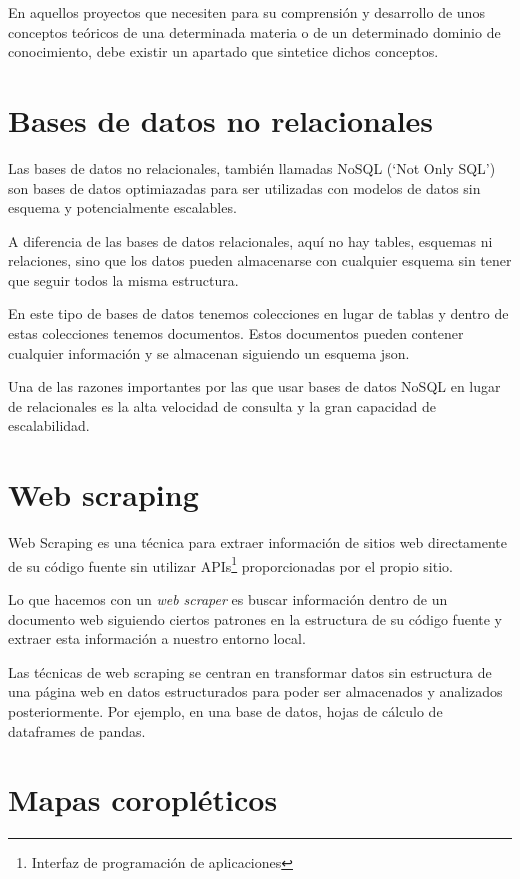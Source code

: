 
En aquellos proyectos que necesiten para su comprensión y desarrollo de unos conceptos teóricos de una determinada materia o de un determinado dominio de conocimiento, debe existir un apartado que sintetice dichos conceptos.


\section{Bases de datos no relacionales}

Las bases de datos no relacionales\cite{wiki:nosql}, también llamadas NoSQL (`Not Only SQL') son bases de datos optimiazadas para ser utilizadas con modelos de datos sin esquema y potencialmente escalables.

A diferencia de las bases de datos relacionales, aquí no hay tables, esquemas ni relaciones, sino que los datos pueden almacenarse con cualquier esquema sin tener que seguir todos la misma estructura.

En este tipo de bases de datos tenemos colecciones en lugar de tablas y dentro de estas colecciones tenemos documentos. Estos documentos pueden contener cualquier información y se almacenan siguiendo un esquema json.

Una de las razones importantes por las que usar bases de datos NoSQL en lugar de relacionales es la alta velocidad de consulta y la gran capacidad de escalabilidad.


\section{Web scraping}

Web Scraping\cite{wiki:webscraping} es una técnica para extraer información de sitios web directamente de su código fuente sin utilizar APIs\footnote{Interfaz de programación de aplicaciones} proporcionadas por el propio sitio.

Lo que hacemos con un \textit{web scraper} es buscar información dentro de un documento web siguiendo ciertos patrones en la estructura de su código fuente y extraer esta información a nuestro entorno local.

Las técnicas de web scraping se centran en transformar datos sin estructura de una página web en datos estructurados para poder ser almacenados y analizados posteriormente. Por ejemplo, en una base de datos, hojas de cálculo de dataframes de pandas.

\section{Mapas coropléticos}

